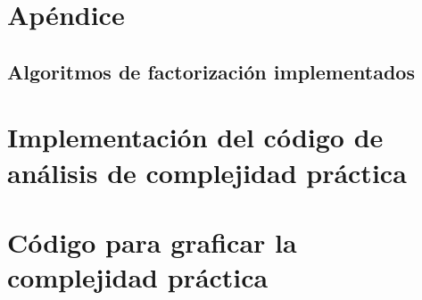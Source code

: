 \documentclass{article}
\begin{document}
\pagebreak
\section{Apéndice}

\subsection{Algoritmos de factorización implementados} \label{sec:algoritmos}



\pagebreak

\section{Implementación del código de análisis de complejidad práctica} \label{sec:complejidad}



\pagebreak
\section{Código para graficar la complejidad práctica} \label{sec:grafica}


\end{document}
